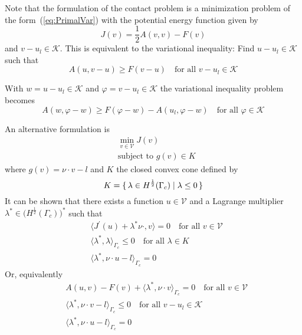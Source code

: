 \documentclass[12pt,a4paper]{article}
\numberwithin{equation}{section}
\numberwithin{table}{section}
\numberwithin{figure}{section}
\newcommand{\half}{\ensuremath{\frac{1}{2}}}
\newcommand{\V}{\ensuremath{\mathcal{V}}}
\newcommand{\K}{\ensuremath{\mathcal{K}}}
\renewcommand{\phi}{\varphi}
\providecommand{\dualp}[2]{\langle #1, #2 \rangle}
\newcommand{\qforall}{\quad\text{for all }}
\begin{document}
Note that the formulation of the contact problem is a minimization problem of the
form~(\ref{eq:PrimalVar}) with the potential energy function given by
\begin{equation}
  \label{eq:PotentialEnergyContact}
  J(v) = \half A(v,v) - F(v)
\end{equation}
and $v-u_l\in\K$.  This is equivalent to the variational inequality:
Find $u-u_l\in\K$ such that
\begin{equation}
  \label{eq:PrimalVarIneq}
  A(u,v-u) \ge F(v-u) \qforall v - u_l\in \K
\end{equation}

With $w=u-u_l\in \K$ and $\phi=v-u_l \in \K$ the variational inequality problem becomes
\begin{equation}
  A(w, \phi-w) \ge F(\phi-w) - A(u_l, \phi-w) \quad\text{for all $\phi\in\K$}
\end{equation}

An alternative formulation is
\begin{equation}
  \begin{split}
    &\min_{v\in\V} J(v) \\
    &\text{subject to $g(v) \in K$}
  \end{split}
\end{equation}
where $g(v) = \nu\cdot v - l$ and $K$ the closed convex cone defined by
\begin{equation}
  K = \set{\lambda \in H^\half(\Gamma_c) | \lambda \le 0}
\end{equation}
It can be shown that there exists a function $u\in\V$ and a Lagrange multiplier
$\lambda^* \in \bigl(H^{\half}(\Gamma_c)\bigr)^*$ such that
\begin{align}
  &\dualp{J^\prime(u) + \lambda^* \nu\cdot}{v} = 0 \quad\text{for all $v\in \V$} \\
  &\dualp{\lambda^*}{\lambda}_{\Gamma_c} \le 0 \quad\text{for all $\lambda\in K$} \\
  &\dualp{\lambda^*}{\nu\cdot u - l}_{\Gamma_c} = 0
\end{align}
Or, equivalently
\begin{align}
  & A(u,v) - F(v) + \dualp{\lambda^*}{\nu\cdot v}_{\Gamma_c} = 0
  \quad\text{for all $v\in \V$} \\
  &\dualp{\lambda^*}{\nu\cdot v - l}_{\Gamma_c} \le 0 \quad\text{for all $v-u_l\in \K$} \\
  &\dualp{\lambda^*}{\nu\cdot u - l}_{\Gamma_c} = 0
\end{align}
\end{document}
